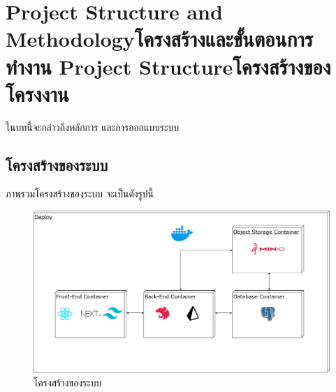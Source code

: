 \chapter{\ifproject%
\ifenglish Project Structure and Methodology\else โครงสร้างและขั้นตอนการทำงาน\fi
\else%
\ifenglish Project Structure\else โครงสร้างของโครงงาน\fi
\fi
}

ในบทนี้จะกล่าวถึงหลักการ และการออกแบบระบบ

\makeatletter


\makeatother

\section{โครงสร้างของระบบ}

ภาพรวมโครงสร้างของระบบ จะเป็นดังรูปนี้

\begin{figure}[H]
  \begin{center}
  \includegraphics[width=1\textwidth]{Untitled Diagram.drawio (3).png}
  \end{center}
  \caption[โครงสร้างของระบบ]{โครงสร้างของระบบ}
\end{figure}
